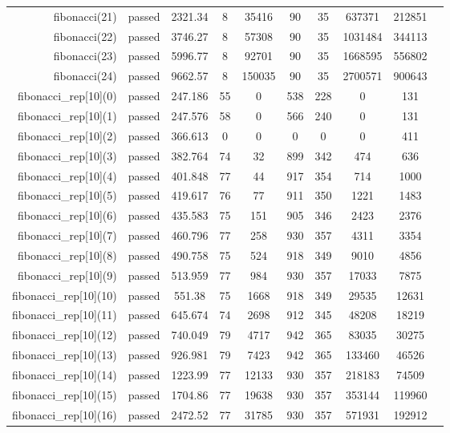 \begin{longtable}{r|ccccccccc}
    fibonacci(21) & passed & 2321.34 & 8 & 35416 & 90 & 35 & 637371 & 212851 \\
    fibonacci(22) & passed & 3746.27 & 8 & 57308 & 90 & 35 & 1031484 & 344113 \\
    fibonacci(23) & passed & 5996.77 & 8 & 92701 & 90 & 35 & 1668595 & 556802 \\
    fibonacci(24) & passed & 9662.57 & 8 & 150035 & 90 & 35 & 2700571 & 900643 \\
    fibonacci\_rep[10](0) & passed & 247.186 & 55 & 0 & 538 & 228 & 0 & 131 \\
    fibonacci\_rep[10](1) & passed & 247.576 & 58 & 0 & 566 & 240 & 0 & 131 \\
    fibonacci\_rep[10](2) & passed & 366.613 & 0 & 0 & 0 & 0 & 0 & 411 \\
    fibonacci\_rep[10](3) & passed & 382.764 & 74 & 32 & 899 & 342 & 474 & 636 \\
    fibonacci\_rep[10](4) & passed & 401.848 & 77 & 44 & 917 & 354 & 714 & 1000 \\
    fibonacci\_rep[10](5) & passed & 419.617 & 76 & 77 & 911 & 350 & 1221 & 1483 \\
    fibonacci\_rep[10](6) & passed & 435.583 & 75 & 151 & 905 & 346 & 2423 & 2376 \\
    fibonacci\_rep[10](7) & passed & 460.796 & 77 & 258 & 930 & 357 & 4311 & 3354 \\
    fibonacci\_rep[10](8) & passed & 490.758 & 75 & 524 & 918 & 349 & 9010 & 4856 \\
    fibonacci\_rep[10](9) & passed & 513.959 & 77 & 984 & 930 & 357 & 17033 & 7875 \\
    fibonacci\_rep[10](10) & passed & 551.38 & 75 & 1668 & 918 & 349 & 29535 & 12631 \\
    fibonacci\_rep[10](11) & passed & 645.674 & 74 & 2698 & 912 & 345 & 48208 & 18219 \\
    fibonacci\_rep[10](12) & passed & 740.049 & 79 & 4717 & 942 & 365 & 83035 & 30275 \\
    fibonacci\_rep[10](13) & passed & 926.981 & 79 & 7423 & 942 & 365 & 133460 & 46526 \\
    fibonacci\_rep[10](14) & passed & 1223.99 & 77 & 12133 & 930 & 357 & 218183 & 74509 \\
    fibonacci\_rep[10](15) & passed & 1704.86 & 77 & 19638 & 930 & 357 & 353144 & 119960 \\
    fibonacci\_rep[10](16) & passed & 2472.52 & 77 & 31785 & 930 & 357 & 571931 & 192912 \\

\end{longtable}
